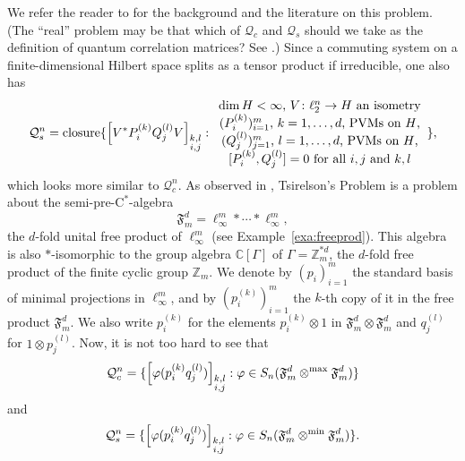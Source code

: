 \documentclass[12pt]{amsart}
\theoremstyle{definition}
\begin{document}
We refer the reader to \cite{fritz,jungeetal,tsirelson} for
the background and the literature on this problem.
(The ``real'' problem may be that which of ${{\mathcal Q}}_c$ and ${{\mathcal Q}}_s$ should we take as
the definition of quantum correlation matrices? See \cite{fritz,act}.)
Since a commuting system on a finite-dimensional Hilbert space splits
as a tensor product if irreducible, one also has
\[
{{\mathcal Q}}_s^n=\mathrm{closure}\{ {\left[ {V^*P_i^{(k)} Q_j^{(l)}V} \right]}_{\begin{subarray}{c}k,l\\ i,j\end{subarray}} :
\begin{array}{c}
\mbox{$\dim{H}<\infty$, $V\colon\ell_2^n\to{H}$ an isometry}\\
\mbox{$(P_i^{(k)})_{i=1}^m$, $k=1,\ldots,d$, PVMs on ${H}$,}\\
\mbox{$(Q_j^{(l)})_{j=1}^m$, $l=1,\ldots,d$, PVMs on ${H}$,}\\
\mbox{$[P_i^{(k)},Q_j^{(l)}]=0$ for all $i,j$ and $k,l$}
\end{array}
\},
\]
which looks more similar to ${{\mathcal Q}}_c^n$. As observed in \cite{fritz,jungeetal},
Tsirelson's Problem is a problem about the {semi-pre-$\mathrm{C}^*$-alge\-bra\xspace}
\[
{{\mathfrak F}_m^d}=\ell_\infty^m*\cdots*\ell_\infty^m,
\]
the $d$-fold unital free product of $\ell_\infty^m$ (see Example~\ref{exa:freeprod}).
This algebra is also $*$-isomorphic to the group algebra ${{\mathbb C}}[{\Gamma}]$ of ${\Gamma}={{\mathbb Z}}_m^{*d}$,
the $d$-fold free product of the finite cyclic group ${{\mathbb Z}}_m$.
We denote by $(p_i)_{i=1}^m$ the standard basis of minimal projections in $\ell_\infty^m$,
and by $(p_i^{(k)})_{i=1}^m$ the $k$-th copy of it in the free product ${{\mathfrak F}_m^d}$.
We also write $p_i^{(k)}$ for the elements $p_i^{(k)}\otimes 1$ in ${{\mathfrak F}_m^d}\otimes{{\mathfrak F}_m^d}$
and $q_j^{(l)}$ for $1\otimes p_j^{(l)}$.
Now, it is not too hard to see that
\[
{{\mathcal Q}}_c^n=\{ {\left[ { {\varphi}(p_i^{(k)}q_j^{(l)}) } \right]}_{\begin{subarray}{c}k,l\\ i,j\end{subarray}} : {\varphi}\in S_n({{\mathfrak F}_m^d}\otimes^{\max}{{\mathfrak F}_m^d})\}
\]
and
\[
{{\mathcal Q}}_s^n=\{ {\left[ { {\varphi}(p_i^{(k)}q_j^{(l)}) } \right]}_{\begin{subarray}{c}k,l\\ i,j\end{subarray}} : {\varphi}\in S_n({{\mathfrak F}_m^d}\otimes^{\min}{{\mathfrak F}_m^d})\}.
\]
\end{document}
